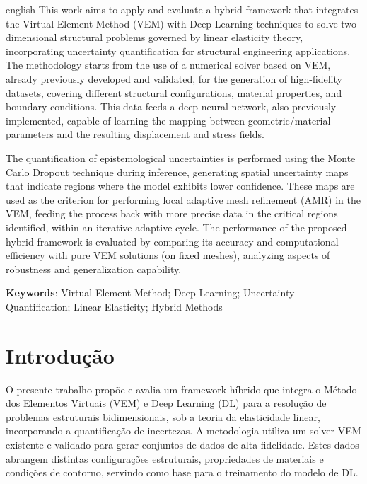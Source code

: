 \documentclass[12pt,openright,oneside,a4paper,english,brazil]{abntex2}
\begin{document}
\begin{resumo}[Abstract]
\begin{otherlanguage*}{english}
This work aims to apply and evaluate a hybrid framework that integrates the Virtual Element Method (VEM) with Deep Learning techniques to solve two-dimensional structural problems governed by linear elasticity theory, incorporating uncertainty quantification for structural engineering applications. The methodology starts from the use of a numerical solver based on VEM, already previously developed and validated, for the generation of high-fidelity datasets, covering different structural configurations, material properties, and boundary conditions. This data feeds a deep neural network, also previously implemented, capable of learning the mapping between geometric/material parameters and the resulting displacement and stress fields.

The quantification of epistemological uncertainties is performed using the Monte Carlo Dropout technique during inference, generating spatial uncertainty maps that indicate regions where the model exhibits lower confidence. These maps are used as the criterion for performing local adaptive mesh refinement (AMR) in the VEM, feeding the process back with more precise data in the critical regions identified, within an iterative adaptive cycle. The performance of the proposed hybrid framework is evaluated by comparing its accuracy and computational efficiency with pure VEM solutions (on fixed meshes), analyzing aspects of robustness and generalization capability.
\vspace{1em}
\begin{center}
\textbf{Keywords}: Virtual Element Method; Deep Learning; Uncertainty Quantification; Linear Elasticity; Hybrid Methods
\end{center}
\end{otherlanguage*}
\end{resumo}

\tableofcontents*

\textual

\chapter[Introdução]{Introdução}

O presente trabalho propõe e avalia um framework híbrido que integra o Método dos Elementos Virtuais (VEM) e Deep Learning (DL) para a resolução de problemas estruturais bidimensionais, sob a teoria da elasticidade linear, incorporando a quantificação de incertezas. A metodologia utiliza um solver VEM existente e validado para gerar conjuntos de dados de alta fidelidade. Estes dados abrangem 
distintas configurações estruturais, propriedades de materiais e condições de contorno, servindo como base para o treinamento do modelo de DL.
\end{document}
